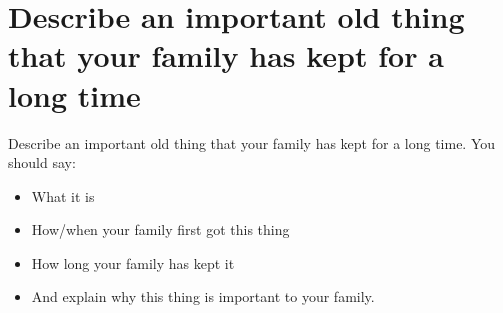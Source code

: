 \section{Describe an important old thing that your family has kept for a long time}
\begin{ieltsprompt}
Describe an important old thing that your family has kept for a long time.
You should say:
\begin{itemize}[leftmargin=2em, itemsep=2pt]
\item What it is
\item How/when your family first got this thing
\item How long your family has kept it
\item And explain why this thing is important to your family.
\end{itemize}
\end{ieltsprompt}
